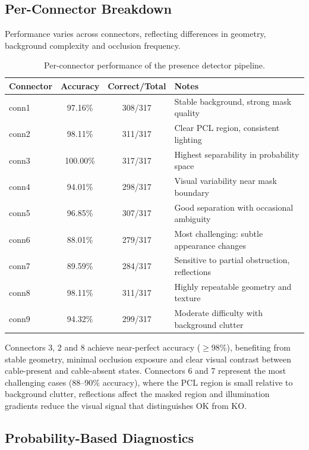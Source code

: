\documentclass[11pt,a4paper,draft]{article}
\begin{document}
\subsection{Per-Connector Breakdown}

Performance varies across connectors, reflecting differences in geometry, background complexity and occlusion frequency.

\begin{table}[H]
\centering
\small
\begin{tabular}{lccl}
\toprule
Connector & Accuracy & Correct/Total & Notes \\
\midrule
conn1 & 97.16\% & 308/317 & Stable background, strong mask quality \\
conn2 & 98.11\% & 311/317 & Clear PCL region, consistent lighting \\
conn3 & 100.00\% & 317/317 & Highest separability in probability space \\
conn4 & 94.01\% & 298/317 & Visual variability near mask boundary \\
conn5 & 96.85\% & 307/317 & Good separation with occasional ambiguity \\
conn6 & 88.01\% & 279/317 & Most challenging: subtle appearance changes \\
conn7 & 89.59\% & 284/317 & Sensitive to partial obstruction, reflections \\
conn8 & 98.11\% & 311/317 & Highly repeatable geometry and texture \\
conn9 & 94.32\% & 299/317 & Moderate difficulty with background clutter \\
\bottomrule
\end{tabular}
\caption{Per-connector performance of the presence detector pipeline.}
\label{tab:per_connector}
\end{table}

Connectors 3, 2 and 8 achieve near-perfect accuracy ($\geq$98\%), benefiting from stable geometry, minimal occlusion exposure and clear visual contrast between cable-present and cable-absent states. Connectors 6 and 7 represent the most challenging cases (88--90\% accuracy), where the PCL region is small relative to background clutter, reflections affect the masked region and illumination gradients reduce the visual signal that distinguishes OK from KO.

\subsection{Probability-Based Diagnostics}
\end{document}
